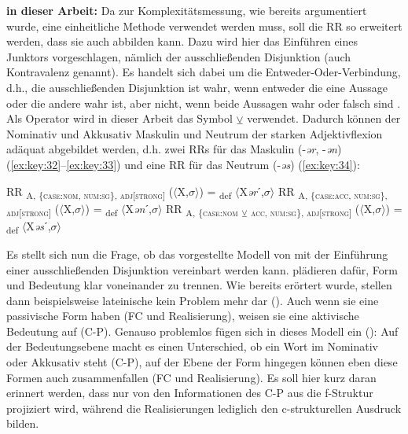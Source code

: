 \begin{exe}
\begin{exe}
\noindent
\textbf{ in dieser Arbeit:} Da zur Komplexitätsmessung, wie bereits argumentiert wurde, eine einheitliche Methode verwendet werden muss, soll die RR so erweitert werden, dass sie auch  abbilden kann. Dazu wird hier das Einführen eines Junktors vorgeschlagen, nämlich der ausschließenden Disjunktion (auch Kontravalenz genannt). Es handelt sich dabei um die Entweder-Oder-Verbindung, d.h., die ausschließenden Disjunktion ist wahr, wenn entweder die eine Aussage oder die andere wahr ist, aber nicht, wenn beide Aussagen wahr oder falsch sind \citep[38]{Zoglauer2008}. Als Operator wird in dieser Arbeit das Symbol ${\veebar}$ verwendet. Dadurch können der Nominativ und Akkusativ Maskulin und Neutrum der starken Adjektivflexion adäquat abgebildet werden, d.h. zwei RRs für das Maskulin (-\textit{ər}, -\textit{ən}) (\ref{ex:key:32}–\ref{ex:key:33}) und eine RR für das Neutrum (-\textit{əs}) (\ref{ex:key:34}):

\ea%
    \label{ex:key:32}
RR \textsubscript{A, \{\textsc{case:nom}, \textsc{num:sg}\}, \textsc{adj[strong]}} ($\langle$X,$\sigma$$\rangle$) = \textsubscript{def} $\langle$X\textit{ər}ˊ,$\sigma$$\rangle$
\z         
\ea%
    \label{ex:key:33}
RR \textsubscript{A, \{\textsc{case:acc}, \textsc{num:sg}\}, \textsc{adj[strong]}} ($\langle$X,$\sigma$$\rangle$) = \textsubscript{def} $\langle$X\textit{ən}ˊ,$\sigma$$\rangle$
\z
\ea%
    \label{ex:key:34}
 RR \textsubscript{A, \{\textsc{case:nom}} \textsubscript{${\veebar}$}\textsubscript{ \textsc{acc}, \textsc{num:sg}\}, \textsc{adj[strong]}} ($\langle$X,$\sigma$$\rangle$) = \textsubscript{def} $\langle$X\textit{əs}ˊ,$\sigma$$\rangle$
\z

Es stellt sich nun die Frage, ob das vorgestellte Modell von \citet{AckermanStump2004} mit der Einführung einer ausschließenden Disjunktion vereinbart werden kann. \citet{AckermanStump2004} plädieren dafür, Form und Bedeutung klar voneinander zu trennen. Wie bereits erörtert wurde, stellen dann beispielsweise lateinische  kein Problem mehr dar (). Auch wenn sie eine passivische Form haben (FC und Realisierung), weisen sie eine aktivische Bedeutung auf (C-P). Genauso problemlos fügen sich  in dieses Modell ein (): Auf der Bedeutungsebene macht es einen Unterschied, ob ein Wort im Nominativ oder Akkusativ steht (C-P), auf der Ebene der Form hingegen können eben diese Formen auch zusammenfallen (FC und Realisierung). Es soll hier kurz daran erinnert werden, dass nur von den Informationen des C-P aus die f-Struk\-tur projiziert wird, während die Realisierungen lediglich den c-struk\-tu\-rel\-len Ausdruck bilden.


\end{exe}
\end{exe}
